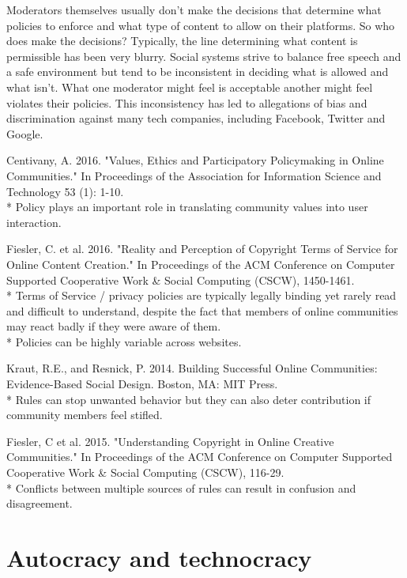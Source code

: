 \documentclass[class=book, crop=false]{standalone}
\begin{document}
Moderators themselves usually don't make the decisions that determine what policies to enforce and what type of content to allow on their platforms. So who does make the decisions? Typically, the line determining what content is permissible has been very blurry. Social systems strive to balance free speech and a safe environment but tend to be inconsistent in deciding what is allowed and what isn't. What one moderator might feel is acceptable another might feel violates their policies. This inconsistency has led to allegations of bias and discrimination against many tech companies, including Facebook, Twitter and Google.

Centivany, A. 2016. "Values, Ethics and Participatory Policymaking in Online Communities." In Proceedings of the Association for Information Science and Technology 53 (1): 1-10.\\
 * Policy plays an important role in translating community values into user interaction.

Fiesler, C. et al. 2016. "Reality and Perception of Copyright Terms of Service for Online Content Creation." In Proceedings of the ACM Conference on Computer Supported Cooperative Work \& Social Computing (CSCW), 1450-1461.\\
 * Terms of Service / privacy policies are typically legally binding yet rarely read and difficult to understand, despite the fact that members of online communities may react badly if they were aware of them.\\
 * Policies can be highly variable across websites.

Kraut, R.E., and Resnick, P. 2014. Building Successful Online Communities: Evidence-Based Social Design. Boston, MA: MIT Press.\\
 * Rules can stop unwanted behavior but they can also deter contribution if community members feel stifled.

Fiesler, C et al. 2015. "Understanding Copyright in Online Creative Communities." In Proceedings of the ACM Conference on Computer Supported Cooperative Work \& Social Computing (CSCW), 116-29.\\
 * Conflicts between multiple sources of rules can result in confusion and disagreement.

\section{Autocracy and technocracy}
\end{document}
